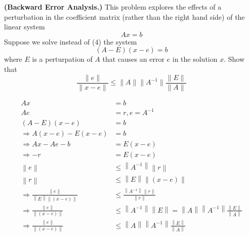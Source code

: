 \textbf{(Backward Error Analysis.)} This problem explores the effects
of a perturbation in the coefficient matrix (rather than the right
hand side) of the linear system \[Ax=b\] Suppose we solve instead of
(4) the system \[(A - E)(x - e) = b\] where $E$ is a perturpation of
$A$ that causes an error $e$ in the solution $x$. Show that \[
\frac{\|e\|}{\| x - e \|} \le \|A\| \|A^{-1}\| \frac{\| E \|}{\| A \|}
\]

{\color{blue}
\begin{align}
Ax&=b\\
Ae&=r, e=A^{-1}\\
(A-E)(x-e)&=b\\
\Rightarrow A(x-e)-E(x-e)&=b\\
\Rightarrow Ax-Ae-b&=E(x-e)\\
\Rightarrow -r&=E(x-e)\\
\left \| e \right \|&\leqslant \left \| A^{-1} \right \|\left \| r \right \|\\
\left \| r \right \|&\leqslant \left \| E \right \|\left \| (x-e) \right \|\\
\Rightarrow \frac{\left \| e \right \|}{\left \| E \right \|\left \| (x-e) \right \|}&\leqslant \frac{\left \| A^{-1} \right \|\left \| r \right \|}{\left \| r \right \|}\\
\Rightarrow \frac{\left \|e  \right \|}{\left \| (x-e) \right \|} &\leqslant\left \| A^{-1} \right \|\left \| E \right \|=\left \| A \right \|\left \| A^{-1} \right \|\frac{\left \| E \right \|}{\left \| A \right \|}\\
\Rightarrow \frac{\left \|e  \right \|}{\left \| (x-e) \right \|} &\leqslant \left \| A \right \|\left \| A^{-1} \right \| \frac{\left \| E \right \|}{\left \| A \right \|}
\end{align}

}
